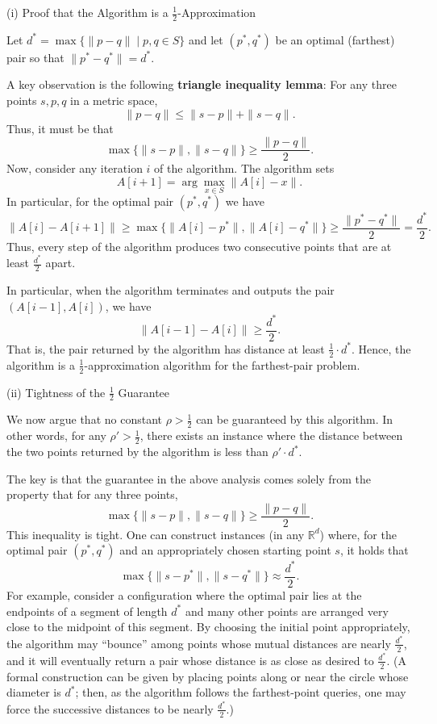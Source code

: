 \documentclass[letterpaper, 11pt]{article}
\newcommand{\1}{\mathds{1}}	%
\theoremstyle{definition}
\newenvironment{solution}{{\par\noindent\it Solution.}}{}
\begin{document}
\begin{solution}
(i) Proof that the Algorithm is a \(\frac{1}{2}\)-Approximation

Let \(d^*= \max \{ \|p - q\| \mid p,q\in S \}\) and let \((p^*,q^*)\) be an optimal (farthest) pair so that \(\|p^*-q^*\| = d^*\).

A key observation is the following {\bf triangle inequality lemma}: For any three points \(s,p,q\) in a metric space,
\[
\|p-q\| \le \|s-p\| + \|s-q\|.
\]
Thus, it must be that
\[
\max\{\|s-p\|,\|s-q\|\} \ge \frac{\|p-q\|}{2}.
\]
Now, consider any iteration \(i\) of the algorithm. The algorithm sets 
\[
A[i+1] = \arg\max_{x\in S} \|A[i]-x\|.
\]
In particular, for the optimal pair \((p^*,q^*)\) we have
\[
\|A[i]-A[i+1]\| \ge \max\{\|A[i]-p^*\|,\|A[i]-q^*\|\} \ge \frac{\|p^*-q^*\|}{2} = \frac{d^*}{2}.
\]
Thus, every step of the algorithm produces two consecutive points that are at least \(\frac{d^*}{2}\) apart.

In particular, when the algorithm terminates and outputs the pair \((A[i-1],A[i])\), we have
\[
\|A[i-1]-A[i]\| \ge \frac{d^*}{2}.
\]
That is, the pair returned by the algorithm has distance at least \(\frac{1}{2} \cdot d^*\). Hence, the algorithm is a \(\frac{1}{2}\)-approximation algorithm for the farthest-pair problem.

(ii) Tightness of the \(\frac{1}{2}\) Guarantee

We now argue that no constant \(\rho > \frac{1}{2}\) can be guaranteed by this algorithm. In other words, for any \(\rho' > \frac{1}{2}\), there exists an instance where the distance between the two points returned by the algorithm is less than \(\rho' \cdot d^*\).

The key is that the guarantee in the above analysis comes solely from the property that for any three points, 
\[
\max\{\|s-p\|,\|s-q\|\} \ge \frac{\|p-q\|}{2}.
\]
This inequality is tight. One can construct instances (in any \(\mathbb{R}^d\)) where, for the optimal pair \((p^*,q^*)\) and an appropriately chosen starting point \(s\), it holds that 
\[
\max\{\|s-p^*\|,\|s-q^*\|\} \approx \frac{d^*}{2}.
\]
For example, consider a configuration where the optimal pair lies at the endpoints of a segment of length \(d^*\) and many other points are arranged very close to the midpoint of this segment. By choosing the initial point appropriately, the algorithm may “bounce” among points whose mutual distances are nearly \(\frac{d^*}{2}\), and it will eventually return a pair whose distance is as close as desired to \(\frac{d^*}{2}\). (A formal construction can be given by placing points along or near the circle whose diameter is \(d^*\); then, as the algorithm follows the farthest‐point queries, one may force the successive distances to be nearly \(\frac{d^*}{2}\).)


\end{solution}
\end{document}
